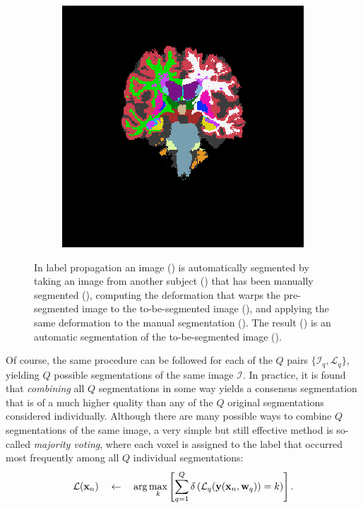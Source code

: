 \documentclass[10pt,twoside]{book}
\begin{document}
\begin{figure}
\begin{subfigure}{0.4\textwidth}
    \caption{}
    \label{fig:labelPropagation_d}
  \end{subfigure}
  \begin{subfigure}{0.4\textwidth}
    \centering
    \includegraphics[width=\textwidth]{labelFusion_voteFromSubject03}
    \caption{}
    \label{fig:labelPropagation_e}
  \end{subfigure}
  \caption{In label propagation an image () is automatically segmented by taking an image from another subject () that has been manually segmented (), computing the deformation that warps the pre-segmented image to the to-be-segmented image (), and applying the same deformation to the manual segmentation (). The result () is an automatic segmentation of the to-be-segmented image ().}
  \label{fig:labelPropagation}
\end{figure}


Of course, the same procedure can be followed for each of the $Q$ pairs $\{ \mathcal{I}_q, \mathcal{L}_q \}$, yielding 
$Q$ possible segmentations of the same image $\mathcal{I}$. In practice, it is found that \emph{combining} all $Q$ segmentations in 
some way yields a consensus segmentation that is of a much higher quality than any of the $Q$ original segmentations considered individually.
Although there are many possible ways to combine $Q$ segmentations of the same image, a very simple but still effective method is 
so-called \emph{majority voting}, where each voxel is assigned to the label that occurred most frequently among all $Q$ individual 
segmentations:
\begin{equation*}
 \mathcal{L}( \mathbf{x}_n ) 
  \quad \gets \quad  
  \arg \max_k\left[  
                    \sum_{q=1}^Q \delta \left( \mathcal{L}_q( \mathbf{y}( \mathbf{x}_n, \mathbf{w}_q ) ) = k \right)
              \right].
\end{equation*}
\end{document}
